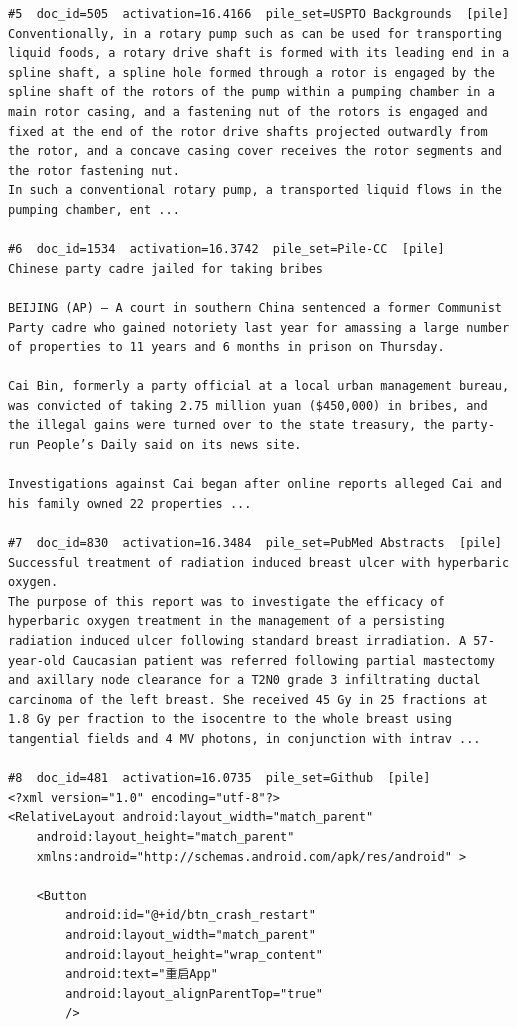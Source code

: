 \begin{verbatim}
#5  doc_id=505  activation=16.4166  pile_set=USPTO Backgrounds  [pile]
Conventionally, in a rotary pump such as can be used for transporting liquid foods, a rotary drive shaft is formed with its leading end in a spline shaft, a spline hole formed through a rotor is engaged by the spline shaft of the rotors of the pump within a pumping chamber in a main rotor casing, and a fastening nut of the rotors is engaged and fixed at the end of the rotor drive shafts projected outwardly from the rotor, and a concave casing cover receives the rotor segments and the rotor fastening nut.
In such a conventional rotary pump, a transported liquid flows in the pumping chamber, ent ...

#6  doc_id=1534  activation=16.3742  pile_set=Pile-CC  [pile]
Chinese party cadre jailed for taking bribes

BEIJING (AP) — A court in southern China sentenced a former Communist Party cadre who gained notoriety last year for amassing a large number of properties to 11 years and 6 months in prison on Thursday.

Cai Bin, formerly a party official at a local urban management bureau, was convicted of taking 2.75 million yuan ($450,000) in bribes, and the illegal gains were turned over to the state treasury, the party-run People’s Daily said on its news site.

Investigations against Cai began after online reports alleged Cai and his family owned 22 properties ...

#7  doc_id=830  activation=16.3484  pile_set=PubMed Abstracts  [pile]
Successful treatment of radiation induced breast ulcer with hyperbaric oxygen.
The purpose of this report was to investigate the efficacy of hyperbaric oxygen treatment in the management of a persisting radiation induced ulcer following standard breast irradiation. A 57-year-old Caucasian patient was referred following partial mastectomy and axillary node clearance for a T2N0 grade 3 infiltrating ductal carcinoma of the left breast. She received 45 Gy in 25 fractions at 1.8 Gy per fraction to the isocentre to the whole breast using tangential fields and 4 MV photons, in conjunction with intrav ...

#8  doc_id=481  activation=16.0735  pile_set=Github  [pile]
<?xml version="1.0" encoding="utf-8"?>
<RelativeLayout android:layout_width="match_parent"
    android:layout_height="match_parent"
    xmlns:android="http://schemas.android.com/apk/res/android" >

    <Button
        android:id="@+id/btn_crash_restart"
        android:layout_width="match_parent"
        android:layout_height="wrap_content"
        android:text="重启App"
        android:layout_alignParentTop="true"
        />


\end{verbatim}
